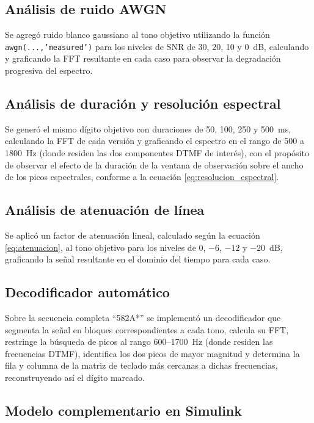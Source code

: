 \documentclass[conference]{IEEEtran}
\begin{document}
\subsection{Análisis de ruido AWGN}

Se agregó ruido blanco gaussiano al tono objetivo utilizando la función \texttt{awgn(...,'measured')} para los niveles de SNR de 30, 20, 10 y 0~dB, calculando y graficando la FFT resultante en cada caso para observar la degradación progresiva del espectro.

\subsection{Análisis de duración y resolución espectral}

Se generó el mismo dígito objetivo con duraciones de 50, 100, 250 y 500~ms, calculando la FFT de cada versión y graficando el espectro en el rango de 500 a 1800~Hz (donde residen las dos componentes DTMF de interés), con el propósito de observar el efecto de la duración de la ventana de observación sobre el ancho de los picos espectrales, conforme a la ecuación \eqref{eq:resolucion_espectral}.

\subsection{Análisis de atenuación de línea}

Se aplicó un factor de atenuación lineal, calculado según la ecuación \eqref{eq:atenuacion}, al tono objetivo para los niveles de 0, $-6$, $-12$ y $-20$~dB, graficando la señal resultante en el dominio del tiempo para cada caso.

\subsection{Decodificador automático}

Sobre la secuencia completa ``582A*'' se implementó un decodificador que segmenta la señal en bloques correspondientes a cada tono, calcula su FFT, restringe la búsqueda de picos al rango 600--1700~Hz (donde residen las frecuencias DTMF), identifica los dos picos de mayor magnitud y determina la fila y columna de la matriz de teclado más cercanas a dichas frecuencias, reconstruyendo así el dígito marcado.

\subsection{Modelo complementario en Simulink}
\end{document}
